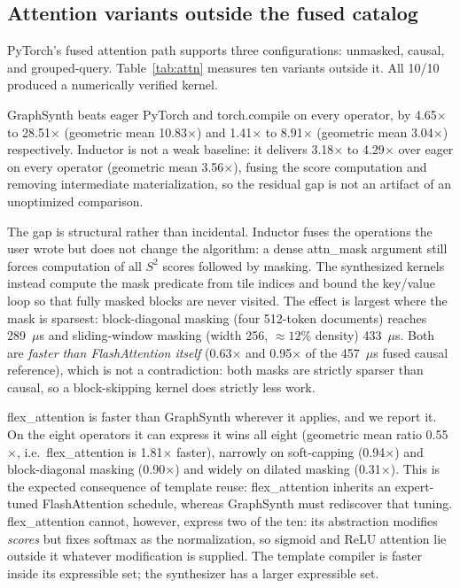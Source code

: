 \documentclass[10pt,twocolumn]{article}
\newcommand{\tc}{torch.compile}
\newcommand{\fx}{flex\_attention}
\begin{document}
\subsection{Attention variants outside the fused catalog}

PyTorch's fused attention path supports three configurations: unmasked, causal, and
grouped-query. Table~\ref{tab:attn} measures ten variants outside it. All 10/10
produced a numerically verified kernel.

GraphSynth beats eager PyTorch and \tc{} on every operator, by
4.65$\times$ to 28.51$\times$ (geometric mean 10.83$\times$) and 1.41$\times$ to
8.91$\times$ (geometric mean 3.04$\times$) respectively. Inductor is not a weak
baseline: it delivers 3.18$\times$ to 4.29$\times$ over eager on every operator
(geometric mean 3.56$\times$), fusing the score computation and removing intermediate
materialization, so the residual gap is not an artifact of an unoptimized comparison.

The gap is structural rather than incidental. Inductor fuses the operations the user
wrote but does not change the algorithm: a dense attn\_mask argument still
forces computation of all $S^2$ scores followed by masking. The synthesized kernels
instead compute the mask predicate from tile indices and bound the key/value loop so
that fully masked blocks are never visited. The effect is largest where the mask is
sparsest: block-diagonal masking (four 512-token documents) reaches 289~$\mu$s and
sliding-window masking (width 256, ${\approx}12\%$ density) 433~$\mu$s. Both are
\emph{faster than FlashAttention itself} (0.63$\times$ and 0.95$\times$ of the
457~$\mu$s fused causal reference), which is not a contradiction: both masks are
strictly sparser than causal, so a block-skipping kernel does strictly less work.

\fx{} is faster than GraphSynth wherever it applies, and we report it. On the
eight operators it can express it wins all eight (geometric mean ratio 0.55$\times$,
i.e.\ \fx{} is 1.81$\times$ faster), narrowly on soft-capping (0.94$\times$) and
block-diagonal masking (0.90$\times$) and widely on dilated masking (0.31$\times$).
This is the expected consequence of template reuse: \fx{} inherits an expert-tuned
FlashAttention schedule, whereas GraphSynth must rediscover that tuning. \fx{} cannot,
however, express two of the ten: its abstraction modifies \emph{scores} but fixes
softmax as the normalization, so sigmoid and ReLU attention lie outside it whatever
modification is supplied. The template compiler is faster inside its expressible set;
the synthesizer has a larger expressible set.
\end{document}
